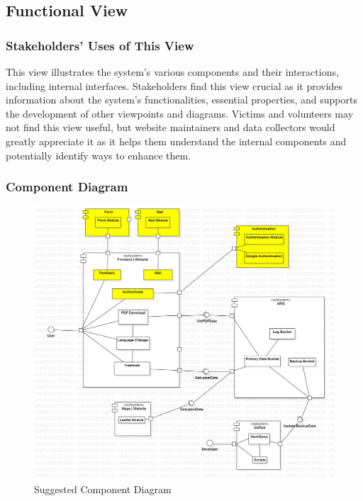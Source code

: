 \subsection{Functional View}

\subsubsection{Stakeholders' Uses of This View}

This view illustrates the system's various components and their interactions, including internal interfaces. Stakeholders find this view crucial as it provides information about the system's functionalities, essential properties, and supports the development of other viewpoints and diagrams. Victims and volunteers may not find this view useful, but website maintainers and data collectors would greatly appreciate it as it helps them understand the internal components and potentially identify ways to enhance them.

\subsubsection{Component Diagram}

\begin{figure}[H]
  \centering
  \includegraphics[width=\linewidth]{img/component-diagram-s5.jpg}
  \caption{Suggested Component Diagram}
\end{figure}

